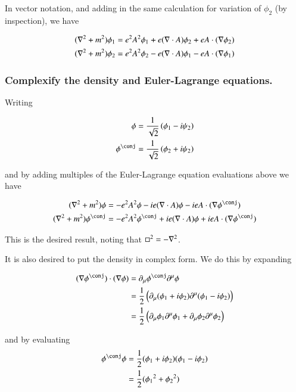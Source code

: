 \documentclass{article}
\begin{document}
In vector notation, and adding in the same calculation for variation of $\phi_2$ (by inspection), we have

\begin{align*}
(\nabla^2 + m^2) \phi_1 &= e^2 A^2 \phi_1 + e (\nabla \cdot A) \phi_2 + e A \cdot (\nabla \phi_2) \\
(\nabla^2 + m^2) \phi_2 &= e^2 A^2 \phi_2 - e (\nabla \cdot A) \phi_1 - e A \cdot (\nabla \phi_1)
\end{align*}

\subsubsection{ Complexify the density and Euler-Lagrange equations. }

Writing

\begin{align*}
\phi &= \inv{\sqrt{2}}\left( \phi_1 - i \psi_2 \right) \\
\phi^\conj &= \inv{\sqrt{2}}\left( \phi_2 + i \psi_2 \right) \\
\end{align*}

and by adding multiples of the Euler-Lagrange equation evaluations above we have

\begin{align*}
(\grad^2 + m^2) \phi &= -e^2 A^2 \phi -i e (\grad \cdot A) \phi - i e A \cdot (\grad \phi^\conj) \\
(\grad^2 + m^2) \phi^\conj &= -e^2 A^2 \phi^\conj + i e (\grad \cdot A) \phi + i e A \cdot (\grad \phi^\conj) \\
\end{align*}

This is the desired result, noting that $\square^2 = -\nabla^2$.

It is also desired to put the density in complex form.  We do this by expanding

\begin{align*}
(\grad \phi^\conj) \cdot (\grad \phi) 
&= \partial_\mu \phi^\conj \partial^\mu \phi \\
&=
\inv{2} \left( \partial_\mu (\phi_1 + i \phi_2) \partial^\mu (\phi_1 - i \phi_2) \right) \\
&=
\inv{2} \left( \partial_\mu \phi_1 \partial^\mu \phi_1 + \partial_\mu \phi_2 \partial^\mu \phi_2 \right) \\
\end{align*}

and by evaluating
\begin{align*}
\phi^\conj \phi 
&= \inv{2} (\phi_1 + i \phi_2) (\phi_1 - i \phi_2) \\
&= \inv{2} ({\phi_1}^2 + {\phi_2}^2 )
\end{align*}
\end{document}
